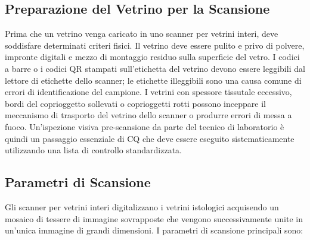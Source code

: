 \subsection{Preparazione del Vetrino per la Scansione}

Prima che un vetrino venga caricato in uno scanner per vetrini interi, deve soddisfare determinati
criteri fisici. Il vetrino deve essere pulito e privo di polvere, impronte digitali e mezzo di
montaggio residuo sulla superficie del vetro. I codici a barre o i codici QR stampati
sull'etichetta del vetrino devono essere leggibili dal lettore di etichette dello scanner; le
etichette illeggibili sono una causa comune di errori di identificazione del campione. I vetrini
con spessore tissutale eccessivo, bordi del coprioggetto sollevati o coprioggetti rotti possono
inceppare il meccanismo di trasporto del vetrino dello scanner o produrre errori di messa a fuoco.
Un'ispezione visiva pre-scansione da parte del tecnico di laboratorio è quindi un passaggio
essenziale di CQ che deve essere eseguito sistematicamente utilizzando una lista di controllo
standardizzata.

\subsection{Parametri di Scansione}

Gli scanner per vetrini interi digitalizzano i vetrini istologici acquisendo un mosaico di
tessere di immagine sovrapposte che vengono successivamente unite in un'unica immagine di grandi
dimensioni. I parametri di scansione principali sono:

